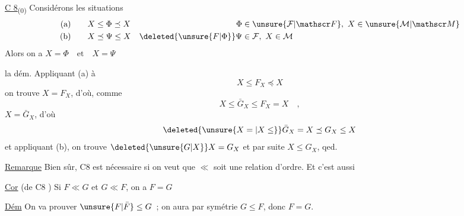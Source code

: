
\noindent\llap{\smash{\rule[-4.9\baselineskip]{.35pt}{5.6\baselineskip}\hspace{.20em}\rule[-4.9\baselineskip]{.35pt}{5.6\baselineskip}}\hspace{.6em}}\uline{C 8}\textsubscript{(0)} Considérons les situations
\[
\begin{aligned}
\text{(a)}\qquad &X\leq\Phi\preceq X & \Phi&\in\unsure{\mathcal F|\mathscr F},\ X\in\unsure{\mathcal M|\mathscr M}\\
\text{(b)}\qquad &X\preceq\Psi\leq X & \deleted{\unsure{F|\Phi}}\Psi&\in\mathcal F,\ X\in\mathcal M
\end{aligned}
\]
Alors on a $X=\Phi\quad\text{et}\quad X=\Psi$

 la dém. Appliquant (a) à
\[
X\leq F_X\preceq X
\]
on trouve $X=F_X$, d'où, comme
\[
X\leq\bar G_X\leq F_X=X\quad,
\]
$X=\bar G_X$, d'où
\[
\deleted{\unsure{X=|X\leq}}\bar G_X=X\preceq G_X\leq X
\]
et appliquant (b), on trouve $\deleted{\unsure{G|X}}X=G_X$ et par suite $X\leq G_X$, qed.

\uline{Remarque} Bien sûr, C8 est nécessaire si on veut que $\ll$ soit une relation d'ordre. Et c'est aussi \unsure{,:|;:|;}

\uline{Cor} (de C8 ) Si $F\ll G$ et $G\ll F$, on a $F=G$

\uline{Dém}  On va prouver $\unsure{F|\bar F}\leq G$\ ;  on aura par symétrie $G\leq F$, donc $F=G$.


